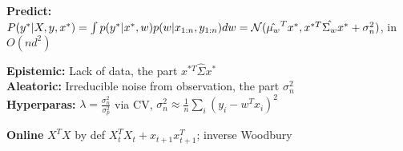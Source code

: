\textbf{Predict:} $P(y^* | X,y,x^*) = \int p(y^* | x^*, w) p(w| x_{1:n}, y_{1:n}) dw\\ 
= \mathcal{N}(\hat{\mu_w}^Tx^*, x^{*T}\hat{\Sigma_w}x^* + \sigma_n^2)$, in $O(nd^2)$\\
\begin{comment}
	The predictive distribution is dependent on the distribution over the weights, as it averages over all possible weights.
	The predicted point $y^*$ adds variance, as the point can be seen as the prediction of $w^Tx^* + \epsilon$.\\
\end{comment}

\textbf{Epistemic:} Lack of data, the part $x^{*T}\hat{\Sigma}x^*$\\
\textbf{Aleatoric:} Irreducible noise from observation, the part $\sigma_n^2$\\

\textbf{Hyperparas:} $\lambda = \frac{\sigma_n^2}{\sigma_p^2}$ via CV, $\sigma_n^2 \approx \frac{1}{n}\sum_i(y_i - w^Tx_i)^2$\\
\begin{comment}
	The variance of the weights can then be derived from these two equations.\\
\end{comment}


\textbf{Online} $X^T X$ by def $ X_t^T X_t + x_{t+1} x_{t+1}^T$; inverse Woodbury